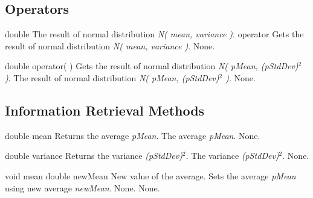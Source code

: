 \clearpage

\subsection{Operators}

\setNormalInstance
\setCorrectWidthThree{8pt}
\printMethodWithParamsSaved
{double}
{The result of normal distribution {\em N( mean, variance )}.}
{operator}
{Gets the result of normal distribution {\em N( mean, variance )}.}
{None.}
\setCorrectWidthThree{4pt}

\setNormalInstance
\printEmptyMethodReturnSpecial
{double}
{operator( )}
{Gets the result of normal distribution {\em N( pMean, (pStdDev)$^2$ )}.}
{The result of normal distribution {\em N( pMean, (pStdDev)$^2$ )}.}
{None.}

\vspace*{10mm}

\subsection{Information Retrieval Methods}

\setConstInstance
\printEmptyMethodReturnSpecial
{double}
{mean}
{Returns the average {\em pMean}.}
{The average {\em pMean}.}
{None.}

\setConstInstance
\printEmptyMethodReturnSpecial
{double}
{variance}
{Returns the variance {\em (pStdDev)$^2$}.}
{The variance {\em (pStdDev)$^2$}.}
{None.}

\clearpage

\setNormalInstance
\printMethodWithOneParam
{void}
{mean}
{double}
{newMean}
{New value of the average.}
{Sets the average {\em pMean} using new average {\em newMean}.}
{None.}
{None.}


